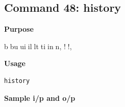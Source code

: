 \subsection{Command 48: history} 
\textbf{Purpose}
\begin{flushleft}
     bbuuiillttiinn, !!, %
\end{flushleft}
\textbf{Usage}
\begin{verbatim}
history
\end{verbatim}
\textbf{Sample i/p and o/p}
\begin{figure}[H] 
\end{figure}
